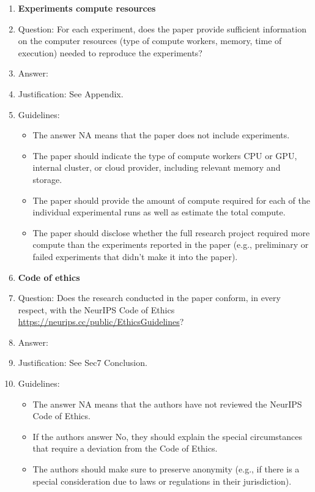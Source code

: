 \documentclass{article}
\begin{document}
\begin{enumerate}
\item {\bf Experiments compute resources}
    \item[] Question: For each experiment, does the paper provide sufficient information on the computer resources (type of compute workers, memory, time of execution) needed to reproduce the experiments?
    \item[] Answer: \answerYes{} %
    \item[] Justification: See Appendix.
    \item[] Guidelines:
    \begin{itemize}
        \item The answer NA means that the paper does not include experiments.
        \item The paper should indicate the type of compute workers CPU or GPU, internal cluster, or cloud provider, including relevant memory and storage.
        \item The paper should provide the amount of compute required for each of the individual experimental runs as well as estimate the total compute. 
        \item The paper should disclose whether the full research project required more compute than the experiments reported in the paper (e.g., preliminary or failed experiments that didn't make it into the paper). 
    \end{itemize}
    
\item {\bf Code of ethics}
    \item[] Question: Does the research conducted in the paper conform, in every respect, with the NeurIPS Code of Ethics \url{https://neurips.cc/public/EthicsGuidelines}?
    \item[] Answer: \answerYes{} %
    \item[] Justification: See Sec7 Conclusion.
    \item[] Guidelines:
    \begin{itemize}
        \item The answer NA means that the authors have not reviewed the NeurIPS Code of Ethics.
        \item If the authors answer No, they should explain the special circumstances that require a deviation from the Code of Ethics.
        \item The authors should make sure to preserve anonymity (e.g., if there is a special consideration due to laws or regulations in their jurisdiction).
    \end{itemize}



\end{enumerate}
\end{document}
